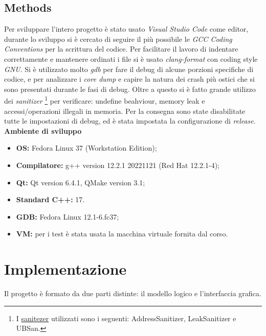 \documentclass[a4paper,10pt]{article}
\begin{document}
\subsection{Methods}
Per sviluppare l'intero progetto è stato usato \emph{Visual Studio Code} come editor, durante lo sviluppo si è cercato di seguire il più possibile le \emph{GCC Coding Conventions} per la scrittura del codice. Per facilitare il lavoro di indentare correttamente e mantenere ordinati i file si è usato \emph{clang-format} con coding style \emph{GNU}. Si è utilizzato molto \emph{gdb} per fare il debug di alcune porzioni specifiche di codice, e per analizzare i \emph{core dump} e capire la natura dei crash più ostici che si sono presentati durante le fasi di debug. Oltre a questo si è fatto grande utilizzo dei \emph{sanitizer}
\footnote{I \href{https://github.com/google/sanitizers}{sanitezer} utilizzati sono i seguenti: AddressSanitizer, LeakSanitizer e UBSan. }
per verificare: undefine beahviour, memory leak e accessi/operazioni illegali in memoria. Per la consegna sono state disabilitate tutte le impostazioni di debug, ed è stata impostata la configurazione di \emph{release}. %
\newline
\newline
{\bfseries Ambiente di sviluppo}
\begin{multicols}{2}
    \begin{itemize}
    \item {\bfseries OS:} Fedora Linux 37 (Workstation Edition);
    \item {\bfseries Compilatore:} g++ version 12.2.1 20221121 (Red Hat 12.2.1-4);
    \item {\bfseries Qt:} Qt version 6.4.1, QMake version 3.1;
    \item {\bfseries Standard C++:} 17.
    \item {\bfseries GDB:} Fedora Linux 12.1-6.fc37;
    \item {\bfseries VM:} per i test è stata usata la macchina virtuale fornita dal corso.
    \end{itemize}
\end{multicols}
\newpage
%
\section {Implementazione}
Il progetto è formato da due parti distinte: il modello logico e l'interfaccia grafica. 
%
\end{document}
